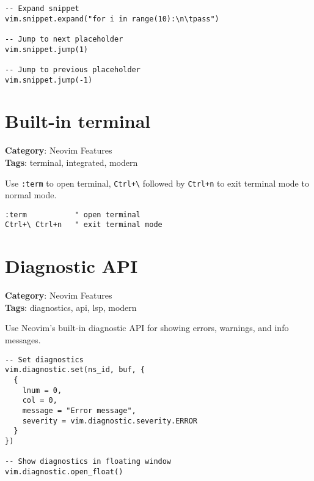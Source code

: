 {{{{{{{{{\begin{Exa*}{}
\begin{Verbatim}[fontsize=\footnotesize, breaklines, breakanywhere]
-- Expand snippet
vim.snippet.expand("for i in range(10):\n\tpass")

-- Jump to next placeholder
vim.snippet.jump(1)

-- Jump to previous placeholder
vim.snippet.jump(-1)
\end{Verbatim}
\end{Exa*}

\section{Built-in terminal}

\textbf{Category}: Neovim Features\\ \textbf{Tags}: terminal, integrated, modern
\vspace{0.5cm}

Use {\footnotesize \Verb§:term§} to open terminal, {\footnotesize \Verb§Ctrl+\§} followed by {\footnotesize \Verb§Ctrl+n§} to exit terminal mode to normal mode.

\begin{Exa*}{}
\begin{Verbatim}[fontsize=\footnotesize, breaklines, breakanywhere]
:term           " open terminal
Ctrl+\ Ctrl+n   " exit terminal mode
\end{Verbatim}
\end{Exa*}

\section{Diagnostic API}

\textbf{Category}: Neovim Features\\ \textbf{Tags}: diagnostics, api, lsp, modern
\vspace{0.5cm}

Use Neovim's built-in diagnostic API for showing errors, warnings, and info messages.

\begin{Exa*}{}
\begin{Verbatim}[fontsize=\footnotesize, breaklines, breakanywhere]
-- Set diagnostics
vim.diagnostic.set(ns_id, buf, {
  {
    lnum = 0,
    col = 0,
    message = "Error message",
    severity = vim.diagnostic.severity.ERROR
  }
})

-- Show diagnostics in floating window
vim.diagnostic.open_float()
\end{Verbatim}
\end{Exa*}

}}}}}}}}}
